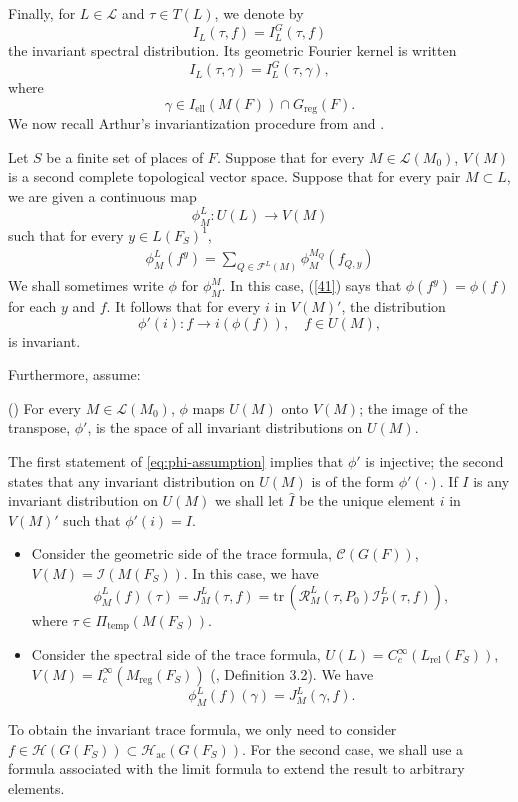 \documentclass[11pt]{amsart}
\renewcommand{\rm}{\mathrm}
\theoremstyle{definition}
\numberwithin{equation}{section}
\begin{document}
	
	Finally, for \(L\in\mathcal L\) and \(\tau\in T(L)\), we denote by
	\[
	I_L(\tau,f)=I_L^G(\tau,f)
	\]
	the invariant spectral distribution. Its geometric Fourier kernel is
	written
	\[
	I_L(\tau,\gamma)=I_L^G(\tau,\gamma),
	\]
	where
	\[
	\gamma\in I_{\mathrm{ell}}(M(F))\cap G_{\mathrm{reg}}(F).
	\]
	We now recall Arthur’s invariantization procedure from \cite{Art81} and \cite{Art94}.
	
	
	
	Let \(S\) be a finite set of places of \(F\). Suppose that for every \( M \in \mathcal{L}(M_0) \), \( V(M) \) is a second complete topological vector space. Suppose that for every pair \( M \subset L \), we are given a continuous map
	\[
	\phi_M^L: U(L) \to V(M)
	\]
	such that for every \( y \in L(F_S)^1 \),
    \begin{align}\label{41}
        \phi_M^L(f^y) = \sum_{Q \in \mathcal{F}^L(M)} \phi_M^{M_Q}(f_{Q, y})
    \end{align}
	We shall sometimes write \( \phi \) for \( \phi_M^M \). In this case, (\ref{41}) says that \( \phi(f^y) = \phi(f) \) for each \( y \) and \( f \). It follows that for every \( i \) in \( V(M)' \), the distribution
	\[
	\phi'(i): f \to i(\phi(f)), \quad f \in U(M),
	\]
	is invariant.
	
	
	Furthermore, assume:
    \par\medskip
\noindent%
\label{eq:phi-assumption}%
\textup{(\theequation)}\quad
For every $M \in \mathscr{L}(M_0)$, $\phi$ maps $U(M)$
onto $V(M)$; the image of the transpose, $\phi'$, is the
space of all invariant distributions on $U(M)$.
	
	
	
	The first statement of \eqref{eq:phi-assumption} implies that \( \phi' \) is injective; the second states that any invariant distribution on \( U(M) \) is of the form \( \phi'(\cdot) \). If \( I \) is any invariant distribution on \( U(M) \) we shall let \( \hat{I} \) be the unique element \( i \) in \( V(M)' \) such that \( \phi'(i) = I \).
	
	
	\begin{itemize}
		\item Consider the geometric side of the trace formula, \(\mathscr{C}(G(F))\), \(V(M)=\mathscr{I}(M(F_S))\). In this case, we have \[\phi^L_M(f)(\tau)=J_M^L(\tau,f)=\rm{tr}\,(\mathscr{R}^L_M(\tau,P_0)\mathscr{I}^L_P(\tau,f)),\] where \(\tau\in \Pi_{\rm{temp}}(M(F_S))\).
		\item Consider the spectral side of the trace formula, \(U(L)=C_c^\infty(L_{\rm{rel}}(F_S))\), \(V(M)=I_c^\infty(M_{\rm{reg}}(F_S))\) (\cite{Art94}, Definition 3.2). We have \[\phi_M^L(f)(\gamma)=J_M^L(\gamma,f).\]
	\end{itemize}
    To obtain the invariant trace formula, we only need to consider \(f\in\mathcal{H}(G(F_S))\subset\mathcal{H}_{\rm{ac}}(G(F_S))\). For the second case, we shall use a formula associated with the limit formula to extend the result to arbitrary elements.
\end{document}
